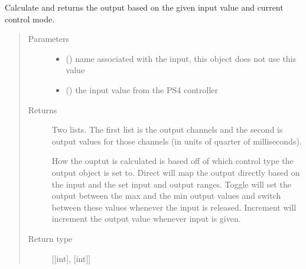 \documentclass[letterpaper,10pt,english]{sphinxmanual}
\begin{document}
\begin{fulllineitems}

\begin{fulllineitems}
\label{\detokenize{specific:SideLipOutput.SideLipOutput.get_output}}
\sphinxAtStartPar
Calculate and returns the output based on the given input value and 
current control mode.
\begin{quote}\begin{description}
\item[{Parameters}] \leavevmode\begin{itemize}
\item {} 
\sphinxAtStartPar
{} () \textendash{} name associated with the input, this object does not 
use this value

\item {} 
\sphinxAtStartPar
{} () \textendash{} the input value from the PS4 controller

\end{itemize}

\item[{Returns}] \leavevmode
\sphinxAtStartPar

\sphinxAtStartPar
Two lists. The first list is the output channels and the second 
is output values for those channels (in units of quarter of milliseconds).

\sphinxAtStartPar
How the ouptut is calculated is based off of which control type the output 
object is set to. Direct will map the output directly based on the input 
and the set input and output ranges. Toggle will set the output between the 
max and the min output values and switch between these values whenever the 
input is released. Increment will increment the output value whenever input 
is given.


\item[{Return type}] \leavevmode
\sphinxAtStartPar
{[}{[}int{]}, {[}int{]}{]}

\end{description}\end{quote}

\end{fulllineitems}


\end{fulllineitems}
\end{document}
